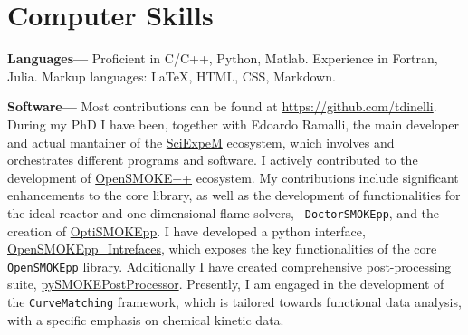 \section{\sc Computer Skills}
{\bf Languages---}
Proficient in C/C++, Python, Matlab. Experience in Fortran, Julia. Markup languages:
\LaTeX, HTML, CSS, Markdown.


{\bf Software---}%
Most contributions can be found at \url{https://github.com/tdinelli}. During my PhD I have
been, together with Edoardo Ramalli, the main developer and actual mantainer of the
\href{https://sciexpem.polimi.it/}{SciExpeM} ecosystem, which involves and orchestrates
different programs and software. I actively contributed to the development of
\href{https://www.opensmokepp.polimi.it/}{OpenSMOKE++} ecosystem. My contributions include
significant enhancements to the core library, as well as the development of
functionalities for the ideal reactor and one-dimensional flame solvers, {\tt
DoctorSMOKEpp}, and the creation of
\href{https://github.com/burn-research/OptiSMOKE_toolbox}{OptiSMOKEpp}. I have developed a
python interface,
\href{https://github.com/tdinelli/OpenSMOKEpp_Interfaces}{OpenSMOKEpp\_Intrefaces}, which
exposes the key functionalities of the core {\tt OpenSMOKEpp} library. Additionally I have
created comprehensive post-processing suite,
\href{https://github.com/tdinelli/pySMOKEPostProcessor}{pySMOKEPostProcessor}. Presently,
I am engaged in the development of the \texttt{CurveMatching} framework, which is tailored
towards functional data analysis, with a specific emphasis on chemical kinetic data.


